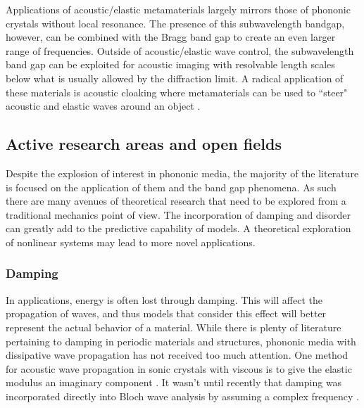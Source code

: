 \documentclass{article}
\begin{document}
Applications of acoustic/elastic metamaterials largely mirrors those of 
phononic crystals without local resonance. The presence of this subwavelength 
bandgap, however, can be combined with the Bragg band gap to create an even 
larger range of frequencies. Outside of acoustic/elastic wave control, the 
subwavelength band gap can be exploited for acoustic imaging with resolvable 
length scales below what is usually allowed by the diffraction limit. A radical 
application of these materials is acoustic cloaking where metamaterials can be 
used to ``steer" acoustic and elastic waves around an object \cite{norris11}.


\subsection{Active research areas and open fields}
Despite the explosion of interest in phononic media, the majority of the 
literature is focused on the application of them and the band gap phenomena. As 
such there are many avenues of theoretical research that need to be explored 
from a traditional mechanics point of view. The incorporation of damping and 
disorder can greatly add to the predictive capability of models. A theoretical 
exploration of nonlinear systems may lead to more novel applications. 


\subsubsection{Damping}
In applications, energy is often lost through damping. This will affect the 
propagation of waves, and thus models that consider this effect will better 
represent the actual behavior of a material. While there is plenty of 
literature pertaining to damping in periodic materials and structures, phononic 
media with dissipative wave propagation has not received too much attention. 
One method for acoustic wave propagation in sonic crystals with 
viscous is to give the elastic modulus an imaginary component \cite{hussein14}. 
It wasn't until recently that damping was incorporated directly into 
Bloch wave analysis by assuming a complex frequency \cite{hussein10}.
\end{document}
